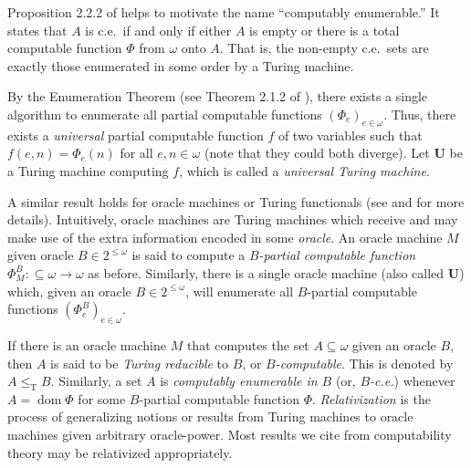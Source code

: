 Proposition 2.2.2 of \cite{DH10} helps to motivate the name ``computably enumerable.'' It states that $A$ is c.e.~if and only if either $A$ is empty or there is a total computable function $\Phi$ from $\omega$ onto $A$. That is, the non-empty c.e.~sets are exactly those enumerated in some order by a Turing machine.

By the Enumeration Theorem (see Theorem 2.1.2 of \cite{DH10}), there exists a single algorithm to enumerate all partial computable functions $(\Phi_e)_{e \in \omega}$. Thus, there exists a \textit{universal} partial computable function $f$ of two variables such that $f(e, n) = \Phi_e(n)$ for all $e, n \in \omega$ (note that they could both diverge). Let $\mathbf{U}$ be a Turing machine computing $f$, which is called a \textit{universal Turing machine}. 

A similar result holds for oracle machines or Turing functionals (see \cite{RS15} and \cite{DH10} for more details). Intuitively, oracle machines are Turing machines which receive and may make use of the extra information encoded in some \textit{oracle}. An oracle machine $M$ given oracle $B \in 2^{\leq \omega}$ is said to compute a \textit{$B$-partial computable function} $\Phi^B_M : \subseteq \omega \to \omega$ as before. Similarly, there is a single oracle machine (also called $\mathbf{U}$) which, given an oracle $B \in 2^{\leq \omega}$, will enumerate all $B$-partial computable functions $(\Phi^B_e)_{e \in \omega}$.

If there is an oracle machine $M$ that computes the set $A \subseteq \omega$ given an oracle $B$, then $A$ is said to be \textit{Turing reducible} to $B$, or \textit{$B$-computable}. This is denoted by $A \leq_{\operatorname{T}} B$. Similarly, a set $A$ is \textit{computably enumerable in $B$} (or, \textit{$B$-c.e.}) whenever $A = \operatorname{dom} \Phi$ for some $B$-partial computable function $\Phi$. \textit{Relativization} is the process of generalizing notions or results from Turing machines to oracle machines given arbitrary oracle-power. Most results we cite from computability theory may be relativized appropriately. 

